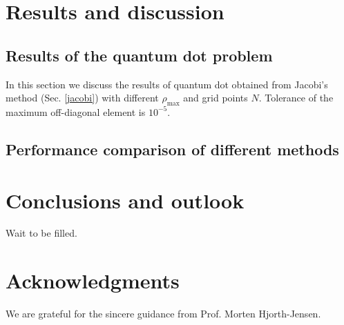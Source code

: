 \documentclass{article}
\begin{document}
	\section{Results and discussion}\label{results}
	\subsection{Results of the quantum dot problem}
In this section we discuss the results of quantum dot obtained from Jacobi's method (Sec. \ref{jacobi}) 
with different $\rho_{\max}$ and grid points $N$. 
Tolerance of the maximum off-diagonal element is $10^{-5}$. 

	\subsection{Performance comparison of different methods}
	 
	
	\section{Conclusions and outlook}\label{conclude}
	Wait to be filled. 
	
	\section*{Acknowledgments}
	We are grateful for the sincere guidance from Prof. Morten Hjorth-Jensen. 
	
	\nocite{*} 
	
	
\end{document}
